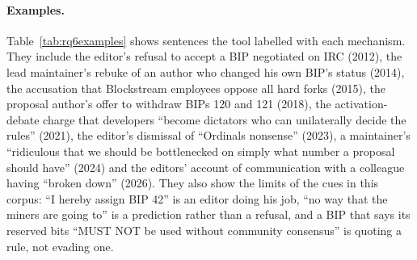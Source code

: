\paragraph{Examples.} Table~\ref{tab:rq6examples} shows sentences the tool labelled with each mechanism. They include the editor's refusal to accept a BIP negotiated on IRC (2012), the lead maintainer's rebuke of an author who changed his own BIP's status (2014), the accusation that Blockstream employees oppose all hard forks (2015), the proposal author's offer to withdraw BIPs 120 and 121 (2018), the activation-debate charge that developers ``become dictators who can unilaterally decide the rules'' (2021), the editor's dismissal of ``Ordinals nonsense'' (2023), a maintainer's ``ridiculous that we should be bottlenecked on simply what number a proposal should have'' (2024) and the editors' account of communication with a colleague having ``broken down'' (2026). They also show the limits of the cues in this corpus: ``I hereby assign BIP 42'' is an editor doing his job, ``no way that the miners are going to'' is a prediction rather than a refusal, and a BIP that says its reserved bits ``MUST NOT be used without community consensus'' is quoting a rule, not evading one.

